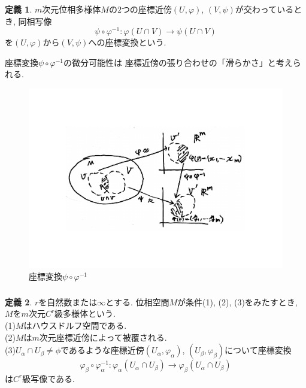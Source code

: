 \documentclass[dvipdfmx,cjk]{beamer}
\theoremstyle{definition}
\newtheorem{dfn}{\textbf{ 定義 }}
\begin{document}
\begin{frame}
  \frametitle{}
  \begin{dfn}
    $m$次元位相多様体$M$の$2$つの座標近傍$(U, \varphi)$, 
    $(V, \psi)$が交わっているとき, 同相写像
    $$\psi \circ \varphi^{-1}:\varphi(U\cap V)\rightarrow \psi(U\cap V)$$
    を$(U, \varphi)$から$(V, \psi)$への座標変換という. 
\end{dfn}
座標変換$\psi \circ \varphi^{-1}$の微分可能性は
座標近傍の張り合わせの「滑らかさ」と考えられる. 
\begin{figure}[H]
    \centering
    \includegraphics[keepaspectratio, scale=0.3]{coordinateConversionBig.pdf}
    \caption{座標変換$\psi \circ \varphi^{-1}$}
    \label{coordinateConversion}
   \end{figure}
\end{frame}

\begin{frame}
  \frametitle{} 
  \begin{dfn}
  $r$を自然数または$\infty$とする. 位相空間$M$が条件(1), (2), (3)をみたすとき, 
  $M$を$m$次元$\mathit{C}^r$級多様体という. \\
  (1)$M$はハウスドルフ空間である. \\
  (2)$M$は$m$次元座標近傍によって被覆される. \\
  (3)$U_\alpha \cap U_\beta \neq \phi$であるような座標近傍$(U_\alpha, \varphi_\alpha)$, 
  $(U_\beta, \varphi_\beta)$について座標変換
  $$\varphi_\beta \circ \varphi_\alpha^{-1}: \varphi_\alpha(U_\alpha \cap U_\beta)
  \rightarrow \varphi_\beta(U_\alpha \cap U_\beta)$$
  は$\mathit{C}^r$級写像である. 
  \end{dfn}
  \end{frame}
  
\end{document}
